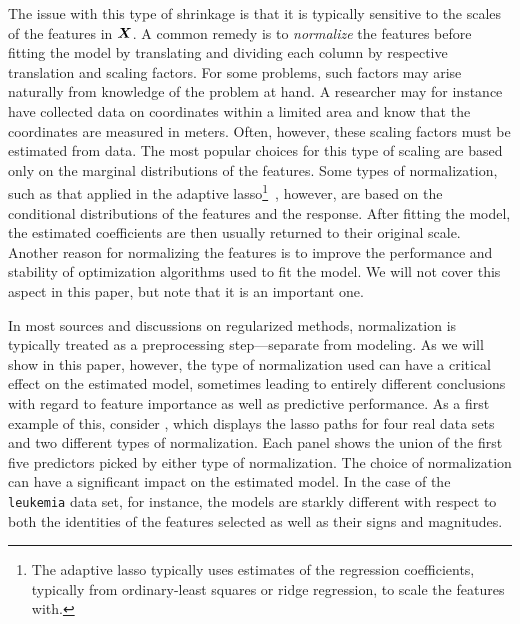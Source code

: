 The issue with this type of shrinkage is that it is typically sensitive to the scales of the features in \(\boldsymbol X\).
A common remedy is to \emph{normalize} the features before fitting the model by translating and dividing each column by respective translation and scaling factors.
For some problems, such factors may arise naturally from knowledge of the problem at hand.
A researcher may for instance have collected data on coordinates within a limited area and know that the coordinates are measured in meters.
Often, however, these scaling factors must be estimated from data.
The most popular choices for this type of scaling are based only on the marginal distributions of the features.
Some types of normalization, such as that applied in the adaptive lasso\footnote{The adaptive lasso typically uses estimates of the regression coefficients, typically from ordinary-least squares or ridge regression, to scale the features with.}~\citep{zou2006}, however, are based on the conditional distributions of the features and the response.
After fitting the model, the estimated coefficients are then usually returned to their original scale.
Another reason for normalizing the features is to improve the performance and stability of optimization algorithms used to fit the model.
We will not cover this aspect in this paper, but note that it is an important one.

In most sources and discussions on regularized methods, normalization is typically treated as a preprocessing step---separate from modeling. As we will show in this paper, however, the type of normalization used can have a critical effect on the estimated model, sometimes leading to entirely different conclusions with regard to feature importance as well as predictive performance. As a first example of this, consider , which displays the lasso paths for four real data sets and two different types of normalization. Each panel shows the union of the first five predictors picked by either type of normalization. The choice of normalization can have a significant impact on the estimated model. In the case of the \texttt{leukemia} data set, for instance, the models are starkly different with respect to both the identities of the features selected as well as their signs and magnitudes.


